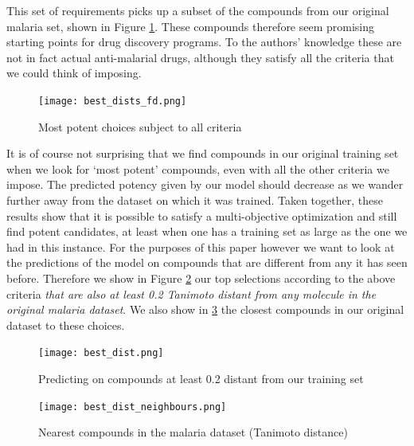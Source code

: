 \documentclass{article}
\begin{document}
This set of requirements picks up a subset of the compounds from our original malaria set, shown in Figure \ref{fig:best_in_data}.  These compounds therefore seem promising starting points for drug discovery programs. To the authors' knowledge these are not in fact actual anti-malarial drugs, although they satisfy all the criteria that we could think of imposing.


\begin{figure}[h!]
\centering
\texttt{[image: best\_dists\_fd.png]}
\caption{Most potent choices subject to all criteria}
\label{fig:best_in_data}
\end{figure}


It is of course not surprising that we find compounds in our original training set when we look for `most potent' compounds, even with all the other criteria we impose.  The predicted potency given by our model should decrease as we wander further away from the dataset on which it was trained.  Taken together,  these results show that it is possible to satisfy a multi-objective optimization and still find  potent candidates, at least when one has a training set as large as the one we had in this instance.
\newline
\newline
For the purposes of this paper however we want to look at the predictions of the model on compounds that are different from any it has seen before.  Therefore we show in Figure \ref{fig:best_choices} our top selections according to the above criteria \textit{that are also at least 0.2 Tanimoto distant from any molecule in the original malaria dataset}.  We also show in \ref{fig:best_choices_neigbours} the closest compounds in our original dataset to these choices.


\begin{figure}[h!]
\centering
\texttt{[image: best\_dist.png]}
\caption{Predicting on compounds at least 0.2 distant from our training set}
\label{fig:best_choices}
\end{figure}


\begin{figure}[h!]
\centering
\texttt{[image: best\_dist\_neighbours.png]}
\caption{Nearest compounds in the malaria dataset (Tanimoto distance)}
\label{fig:best_choices_neigbours}
\end{figure}
\end{document}
